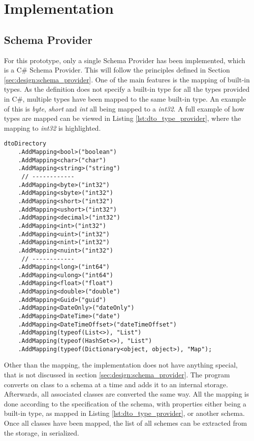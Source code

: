 \section{Implementation \label{sec:implementation}}

\subsection{Schema Provider}
For this prototype, only a single Schema Provider has been implemented, which is a C\# Schema Provider.
This will follow the principles defined in Section \ref{sec:design:schema_provider}.
One of the main features is the mapping of built-in types.
As the definition does not specify a built-in type for all the types provided in C\#, multiple types have been mapped to the same built-in type.
An example of this is \textit{byte}, \textit{short} and \textit{int} all being mapped to a \textit{int32}.
A full example of how types are mapped can be viewed in Listing \ref{lst:dto_type_provider}, where the mapping to \textit{int32} is highlighted. 
\begin{lstlisting}[caption={C\# type schema mapping}, label={lst:dto_type_provider}, style=base_csharp]
dtoDirectory
    .AddMapping<bool>("boolean")
    .AddMapping<char>("char")
    .AddMapping<string>("string")
     // ------------
    .AddMapping<byte>("int32")
    .AddMapping<sbyte>("int32")
    .AddMapping<short>("int32")
    .AddMapping<ushort>("int32") 
    .AddMapping<decimal>("int32")
    .AddMapping<int>("int32")
    .AddMapping<uint>("int32")
    .AddMapping<nint>("int32")
    .AddMapping<nuint>("int32")
     // ------------
    .AddMapping<long>("int64")
    .AddMapping<ulong>("int64")
    .AddMapping<float>("float")
    .AddMapping<double>("double")
    .AddMapping<Guid>("guid")
    .AddMapping<DateOnly>("dateOnly")
    .AddMapping<DateTime>("date")
    .AddMapping<DateTimeOffset>("dateTimeOffset")
    .AddMapping(typeof(List<>), "List")
    .AddMapping(typeof(HashSet<>), "List")
    .AddMapping(typeof(Dictionary<object, object>), "Map");
\end{lstlisting}
\noindent
Other than the mapping, the implementation does not have anything special, that is not discussed in section \ref{sec:design:schema_provider}.
The program converts on class to a schema at a time and adds it to an internal storage.
Afterwards, all associated classes are converted the same way.
All the mapping is done according to the specification of the schema, with properties either being a built-in type, as mapped in Listing \ref{lst:dto_type_provider}, or another schema.
Once all classes have been mapped, the list of all schemes can be extracted from the storage, in serialized.

